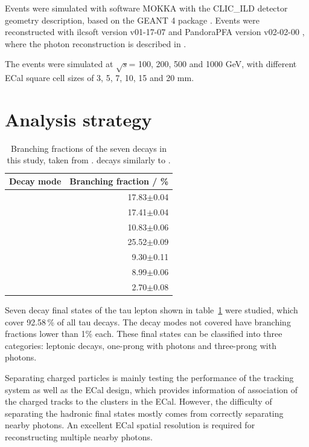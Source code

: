 \documentclass[a4paper,11pt]{article}
\newcommand{\decayElectron}{\Pem\PAGne\PGnGt}
\newcommand{\decayMuon}{\PGpm\PAGnGm\PGnGt}
\newcommand{\decayPion}{\PGpm\PGnGt}
\newcommand{\decayRho}{\PGrP{\PGpm\PGpz}\PGnGt}
\newcommand{\decayAiPhoton}{\PaDoP{\PGpm\PGpz\PGpz}\PGnGt}
\newcommand{\decayAiPion}{\PaDoP{\PGpm\PGpm\PGpp}\PGnGt}
\newcommand{\decayThreePionPhoton}{\PGpm\PGpm\PGpp\PGnGt}
\newcommand{\rootS}{\ensuremath{\sqrt{s}}}
\begin{document}
Events were simulated with software MOKKA \cite{MoradeFreitas:2002kj} with the CLIC\_ILD detector geometry description, based on the GEANT 4 package  \cite{Agostinelli:2002hh}. Events were reconstructed with ilcsoft version v01-17-07 \cite{Gaede:82475} and PandoraPFA version v02-02-00 \cite{Marshall:2015rfa}, where the photon reconstruction is described in \cite{Xu:2016rcz}.

The events were simulated at \rootS = 100, 200, 500 and 1000 GeV, with different ECal square cell sizes of 3, 5, 7, 10, 15 and 20 mm.

\section{Analysis strategy}

\begin{table}[htbp]
\centering
\caption{\label{tab:decay_mode} Branching fractions of the seven \Ptauon decays in this study, taken from \cite{Agashe:2014kda}. \APtauon decays similarly to \Ptauon.}
\smallskip
\begin{tabular}{|l |r|}
\hline
  \textbf{Decay mode} & \textbf{Branching fraction / \%} \\
\hline
  \decayElectron        & 17.83$\pm$0.04   \\
  \decayMuon  	& 17.41$\pm$0.04  \\
  \decayPion     	& 10.83$\pm$0.06   \\
  \decayRho	& 25.52$\pm$0.09 \\
  \decayAiPhoton	& 9.30$\pm$0.11    \\
  \decayAiPion  	    & 8.99$\pm$0.06  \\
  \decayThreePionPhoton  	    & 2.70$\pm$0.08  \\

\hline
\end{tabular}
\end{table}

Seven decay final states of the tau lepton shown in table~\ref{tab:decay_mode} were studied, which cover 92.58\,\% of all tau decays. The decay modes not covered have branching fractions lower than 1\% each. These final states can be classified into three categories: leptonic decays, one-prong with photons and three-prong with photons. 

Separating charged particles is mainly testing the performance of the tracking system as well as the ECal design, which provides information of association of the charged tracks to the clusters in the ECal. However, the difficulty of separating the hadronic final states mostly comes from correctly separating nearby photons. An excellent ECal spatial resolution is required for reconstructing multiple nearby photons.
\end{document}

